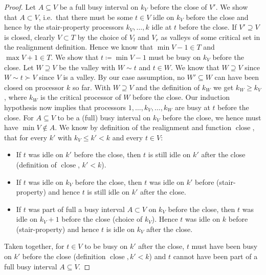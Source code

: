 \documentclass[a4paper]{article}
\DeclareMathOperator{\close}{close}
\begin{document}
\begin{proof}
      Let $A \subseteq V$ be a full busy interval on $k_V$ before the close of $V'$.
      We show that $A \subset V$, i.e.\ that there must be some $t \in V$ idle on $k_V$ before the close and hence by the stair-property processors $k_V, \ldots, k$ idle at $t$ before the close.
      If $V' \supseteq V$ is closed, clearly $V \subset T$ by the choice of $V_l$ and $V_r$ as valleys of some critical set in the realignment definition.
      Hence we know that $\min V - 1 \in T$ and $\max V + 1 \in T$.
      We show that $t \coloneqq \min V - 1$ must be busy on $k_V$ before the close.
      Let $W \supseteq V$ be the valley with $W \sim t$ and $t \in W$.
      We know that $W \supseteq V$ since $W \sim t \succ V$ since $V$ is a valley.
      By our case assumption, no $W' \subseteq W$ can have been closed on processor $k$ so far.
      With $W \supseteq V$ and the definition of $k_W$ we get $k_W \geq k_V$, where $k_W$ is the critical processor of $W$ before the close.
      Our induction hypothesis now implies that processors $1, \ldots, k_V, \ldots, k_W$ are busy at $t$ before the close.
      For $A \subseteq V$ to be a (full) busy interval on $k_V$ before the close, we hence must have $\min V \notin A$.
      We know by definition of the realignment and function $\close$, that for every $k'$ with $k_V \leq k' < k$ and every $t \in V$:
      \begin{itemize}
        \item
          If $t$ was idle on $k'$ before the close, then $t$ is still idle on $k'$ after the close (definition of $\close$, $k' < k$).
        \item
          If $t$ was idle on $k_V$ before the close, then $t$ was idle on $k'$ before (stair-property) and hence $t$ is still idle on $k'$ after the close.
        \item
          If $t$ was part of full a busy interval $A \subset V$ on $k_V$ before the close, then $t$ was idle on $k_V + 1$ before the close (choice of $k_V$).
          Hence $t$ was idle on $k$ before (stair-property) and hence $t$ is idle on $k_V$ after the close.
      \end{itemize}
      Taken together, for $t \in V$ to be busy on $k'$ after the close, $t$ must have been busy on $k'$ before the close (definition $\close, k' < k$) and $t$ cannot have been part of a full busy interval $A \subseteq V$.

\end{proof}
\end{document}
